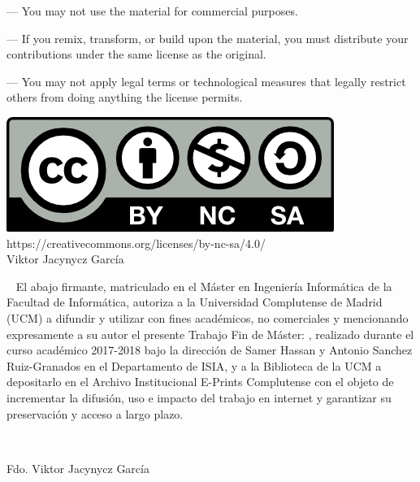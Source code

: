{\begin{itemize}
   — You may not use the material for commercial purposes.

   — If you remix, transform, or build upon the material, you must
  distribute your contributions under the same license as the original.

   — You may not apply legal terms or technological
  measures that legally restrict others from doing anything the license permits.
  \end{itemize}
\begin{center}

  \includegraphics{TeXiS/by-nc-sa.png}\\%
  https://creativecommons.org/licenses/by-nc-sa/4.0/\\%
  Viktor Jacynycz García
\end{center}
\newpage
\thispagestyle{empty} \mbox{ } \vskip 5cm El abajo firmante, matriculado en el
Máster en Ingeniería Informática de la Facultad de Informática, autoriza a la
Universidad Complutense de Madrid (UCM) a difundir y utilizar con fines
académicos, no comerciales y mencionando expresamente a su autor el presente
Trabajo Fin de Máster: \emph{\tituloPortadaVal}, realizado durante el curso
académico 2017-2018 bajo la dirección de Samer Hassan y Antonio Sanchez
Ruiz-Granados en el Departamento de ISIA, y a la Biblioteca de la UCM a
depositarlo en el Archivo Institucional E-Prints Complutense con el objeto de
incrementar la difusión, uso e impacto del trabajo en internet y garantizar su
preservación y acceso a largo plazo.

\mbox{ } \vskip 5cm
\begin{center}
  Fdo. Viktor Jacynycz García
\end{center}
}%

